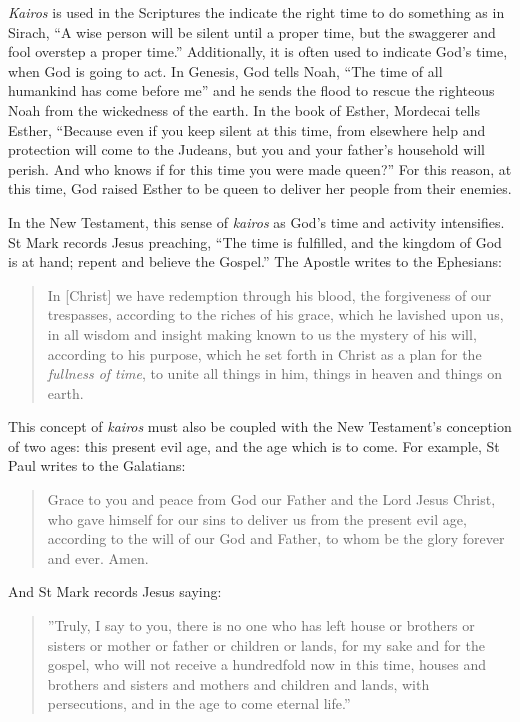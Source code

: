 \documentclass[
]{article}
\newcommand{\RL}[1]{\beginR #1\endR}
\begin{document}
\emph{Kairos} is used in the Scriptures the indicate the right time to
do something as in Sirach, ``A wise person will be silent until a proper
time, but the swaggerer and fool overstep a proper time.'' Additionally,
it is often used to indicate God's time, when God is going to act. In
Genesis, God tells Noah, ``The time of all humankind has come before
me'' and he sends the flood to rescue the righteous Noah from the
wickedness of the earth. In the book of Esther, Mordecai tells Esther,
``Because even if you keep silent at this time, from elsewhere help and
protection will come to the Judeans, but you and your father\RL{'}s
household will perish. And who knows if for this time you were made
queen?'' For this reason, at this time, God raised Esther to be queen to
deliver her people from their enemies.

In the New Testament, this sense of \emph{kairos} as God's time and
activity intensifies. St Mark records Jesus preaching, ``The time is
fulfilled, and the kingdom of God is at hand; repent and believe the
Gospel.'' The Apostle writes to the Ephesians:

\begin{quote}
In {[}Christ{]} we have redemption through his blood, the forgiveness of
our trespasses, according to the riches of his grace, which he lavished
upon us, in all wisdom and insight making known to us the mystery of his
will, according to his purpose, which he set forth in Christ as a plan
for the \emph{fullness of time}, to unite all things in him, things in
heaven and things on earth.
\end{quote}

This concept of \emph{kairos} must also be coupled with the New
Testament's conception of two ages: this present evil age, and the age
which is to come. For example, St Paul writes to the Galatians:

\begin{quote}
Grace to you and peace from God our Father and the Lord Jesus Christ,
who gave himself for our sins to deliver us from the present evil age,
according to the will of our God and Father, to whom be the glory
forever and ever. Amen.
\end{quote}

And St Mark records Jesus saying:

\begin{quote}
\RL{''}Truly, I say to you, there is no one who has left house or
brothers or sisters or mother or father or children or lands, for my
sake and for the gospel, who will not receive a hundredfold now in this
time, houses and brothers and sisters and mothers and children and
lands, with persecutions, and in the age to come eternal life.''
\end{quote}
\end{document}
